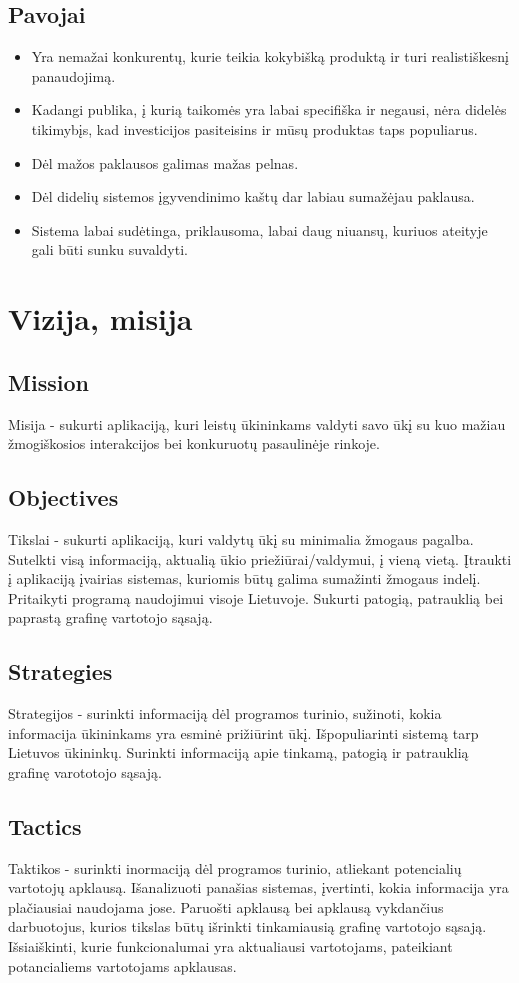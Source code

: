\documentclass[oneside]{VUMIFPSkursinis}
\begin{document}
	\subsection{Pavojai}
	\begin{itemize}
	\item Yra nemažai konkurentų, kurie teikia kokybišką produktą ir turi realistiškesnį panaudojimą.
	\item Kadangi publika, į kurią taikomės yra labai specifiška ir negausi, nėra didelės tikimybįs, kad investicijos pasiteisins ir mūsų produktas taps populiarus.
	\item Dėl mažos paklausos galimas mažas pelnas.
	\item Dėl didelių sistemos įgyvendinimo kaštų dar labiau sumažėjau paklausa.
	\item Sistema labai sudėtinga, priklausoma, labai daug niuansų, kuriuos ateityje gali būti sunku suvaldyti.
	\end{itemize}
	
\section{Vizija, misija}
\subsection{Mission}
Misija - sukurti aplikaciją, kuri leistų ūkininkams valdyti savo ūkį su kuo mažiau žmogiškosios interakcijos bei konkuruotų pasaulinėje rinkoje.
\subsection{Objectives}
Tikslai - sukurti aplikaciją, kuri valdytų ūkį su minimalia žmogaus pagalba.
Sutelkti visą informaciją, aktualią ūkio priežiūrai/valdymui, į vieną vietą.
Įtraukti į aplikaciją įvairias sistemas, kuriomis būtų galima sumažinti žmogaus indelį.
Pritaikyti programą naudojimui visoje Lietuvoje.
Sukurti patogią, patrauklią bei paprastą grafinę vartotojo sąsają.
\subsection{Strategies}
Strategijos - surinkti informaciją dėl programos turinio, sužinoti, kokia informacija ūkininkams yra esminė prižiūrint ūkį.
Išpopuliarinti sistemą tarp Lietuvos ūkininkų.
Surinkti informaciją apie tinkamą, patogią ir patrauklią grafinę varototojo sąsają.
\subsection{Tactics}
Taktikos - surinkti inormaciją dėl programos turinio, atliekant potencialių vartotojų apklausą.
Išanalizuoti panašias sistemas, įvertinti, kokia informacija yra plačiausiai naudojama jose.
Paruošti apklausą bei apklausą vykdančius darbuotojus, kurios tikslas būtų išrinkti tinkamiausią grafinę vartotojo sąsają.
Išsiaiškinti, kurie funkcionalumai yra aktualiausi vartotojams, pateikiant potancialiems vartotojams apklausas.
\end{document}
